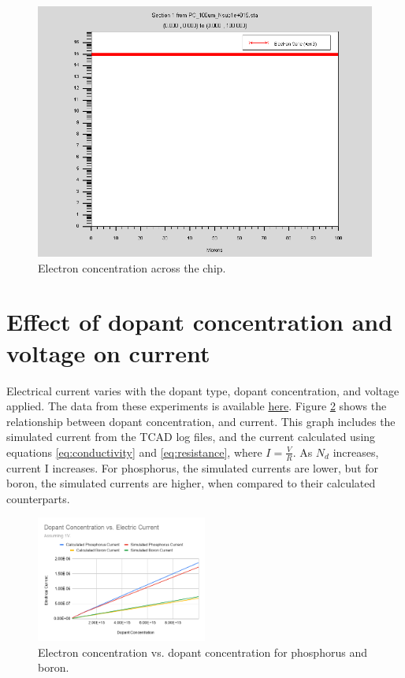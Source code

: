 \documentclass[12pt]{article}
\begin{document}
\begin{figure}[H]
  \centering
  \includegraphics[width=\textwidth]{econc}
  \caption{Electron concentration across the chip.}
  \label{fig:econc}
\end{figure}

\section{Effect of dopant concentration and voltage on current}
Electrical current varies with the dopant type, dopant concentration, and voltage applied. The data from these experiments is available \href{https://docs.google.com/spreadsheets/d/1gYwgjLNNKRn5CSeJdrwOt3nx-jSYUwJLR_BUbzWCe9E/edit?usp=sharing}{here}. Figure \ref{fig:concvcurrent} shows the relationship between dopant concentration, and current. This graph includes the simulated current from the TCAD log files, and the current calculated using equations \eqref{eq:conductivity} and \eqref{eq:resistance}, where $I=\frac{V}{R}$. As $N_d$ increases, current {{I}} increases. For phosphorus, the simulated currents are lower, but for boron, the simulated currents are higher, when compared to their calculated counterparts.

\begin{figure}[H]
  \centering
  \includegraphics[width=0.5\textwidth]{concvcurrent}
  \caption{Electron concentration vs. dopant concentration for phosphorus and boron.}
  \label{fig:concvcurrent}
\end{figure}
\end{document}
